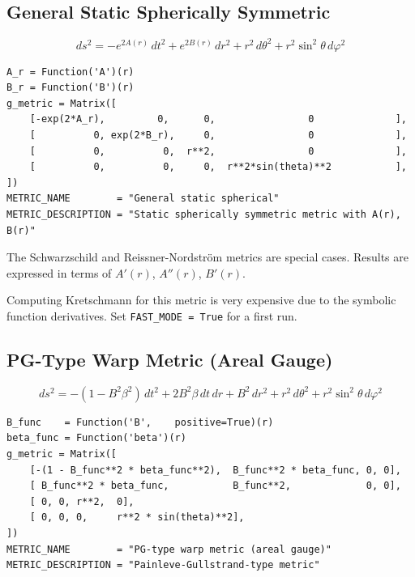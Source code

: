 \documentclass[11pt,a4paper]{article}
\newcommand{\code}[1]{\texttt{\small#1}}
\begin{document}
\subsection{General Static Spherically Symmetric}
\label{sec:m-gensph}

\[
  ds^2 = -e^{2A(r)}\,dt^2 + e^{2B(r)}\,dr^2
         + r^2\,d\theta^2 + r^2\sin^2\!\theta\,d\varphi^2
\]

\begin{lstlisting}
A_r = Function('A')(r)
B_r = Function('B')(r)
g_metric = Matrix([
    [-exp(2*A_r),         0,      0,                0              ],
    [          0, exp(2*B_r),     0,                0              ],
    [          0,          0,  r**2,                0              ],
    [          0,          0,     0,  r**2*sin(theta)**2           ],
])
METRIC_NAME        = "General static spherical"
METRIC_DESCRIPTION = "Static spherically symmetric metric with A(r), B(r)"
\end{lstlisting}

The Schwarzschild and Reissner-Nordström metrics are special cases.
Results are expressed in terms of $A'(r)$, $A''(r)$, $B'(r)$.

\begin{notebox}
  Computing Kretschmann for this metric is very expensive due to the
  symbolic function derivatives.  Set \code{FAST\_MODE = True} for a
  first run.
\end{notebox}

\subsection{PG-Type Warp Metric (Areal Gauge)}
\label{sec:m-pg-areal}

\[
  ds^2 = -(1 - B^2\beta^2)\,dt^2
         + 2B^2\beta\,dt\,dr
         + B^2\,dr^2 + r^2\,d\theta^2 + r^2\sin^2\!\theta\,d\varphi^2
\]

\begin{lstlisting}
B_func    = Function('B',    positive=True)(r)
beta_func = Function('beta')(r)
g_metric = Matrix([
    [-(1 - B_func**2 * beta_func**2),  B_func**2 * beta_func, 0, 0],
    [ B_func**2 * beta_func,           B_func**2,             0, 0],
    [ 0, 0, r**2,  0],
    [ 0, 0, 0,     r**2 * sin(theta)**2],
])
METRIC_NAME        = "PG-type warp metric (areal gauge)"
METRIC_DESCRIPTION = "Painleve-Gullstrand-type metric"
\end{lstlisting}
\end{document}
